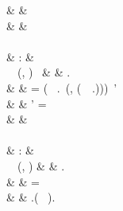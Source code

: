 \begin{figure}[H]
\begin{functioncode}
{                                                                    &               &   \quad \quad\quad \pseudoelse \nonesym \\
                                                                    &               &   \pseudoelse \nonesym \\~\\
                                                    &   :           &   \State \to \Loc \to \Val \to \Optiontype{\State} \\
 \ \Statevar \ (\Simplelocvar, \Basesvar) \ \Valvar &   \triangleq  &   \pseudoif \Statevar.\Memstatemember \validsym \Simplelocvar \ \pseudothen \\
                                                                    &               &   \quad \pseudolet \Restrictstackvar = ( \ \Statevar.\Restrictstatemember \ (\Simplelocvar, (\filterinactive \ \Basesvar \ \Statevar.\Scopesstatemember)))\errbind \ \pseudoin \Statevar' \\
                                                                    &               &   \quad \quad \pseudowhere \Statevar' = \Statevar \pseudowith [ \\
                                                                    &               &   \quad \quad\quad \Memstatemember := \Statevar.\Memstatemember\set{\Simplelocvar \leftarrow \Valvar}, \\
                                                                    &               &   \quad \quad\quad \Restrictstatemember := \Restrictstackvar \\
                                                                    &               &   \quad \quad ] \\
                                                                    &               &   \pseudoelse \nonesym \\~\\
                                                     &   :           &   \State \to \Loc \to \Optiontype{\State}  \\
 \ \Statevar \ (\Simplelocvar, \Basesvar)            &   \triangleq  &   \pseudoif \Statevar.\Memstatemember \validsym \Simplelocvar \ \pseudothen \\
                                                                    &               &   \quad \pseudolet \Restrictstackvar = \\
                                                                    &               &   \quad \quad \pseudoif \Statevar.\Memstatemember( \ \Simplelocvar).\Memblockmemberdyn \ \pseudothen \\
}
\end{functioncode}
\end{figure}

